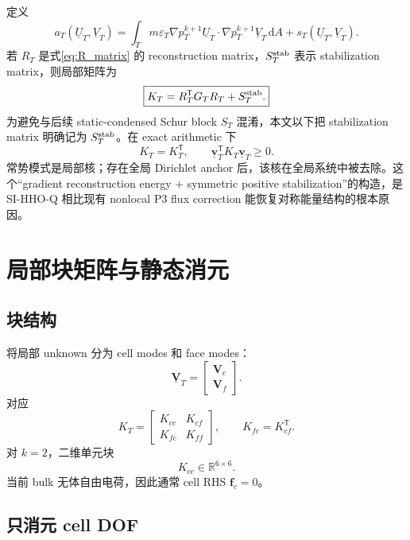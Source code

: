 \documentclass[UTF8,a4paper,11pt]{ctexart}
\newcommand{\R}{\mathbb{R}}
\newcommand{\dd}{\mathrm{d}}
\newcommand{\eps}{\varepsilon}
\newcommand{\vct}[1]{\bm{#1}}
\newcommand{\T}{\mathsf{T}}
\begin{document}
定义
\begin{equation}
\boxed{
 a_T(\underline U_T,\underline V_T)
 =
 \int_Tm\eps_T
 \nabla p_T^{k+1}\underline U_T\cdot
 \nabla p_T^{k+1}\underline V_T\,\dd A
 +s_T(\underline U_T,\underline V_T).
}
\label{eq:local_bilinear}
\end{equation}
若 \(R_T\) 是式\eqref{eq:R_matrix} 的 reconstruction matrix，\(S_T^{\rm stab}\) 表示 stabilization matrix，则局部矩阵为
\begin{equation}
\boxed{
K_T=R_T^{\T}G_TR_T+S_T^{\rm stab}.
}
\label{eq:local_matrix}
\end{equation}
为避免与后续 static-condensed Schur block \(S_T\) 混淆，本文以下把 stabilization matrix 明确记为 \(S_T^{\rm stab}\)。在 exact arithmetic 下
\[
K_T=K_T^{\T},\qquad
\underline{\vct v}_T^{\T}K_T\underline{\vct v}_T\ge0.
\]
常势模式是局部核；存在全局 Dirichlet anchor 后，该核在全局系统中被去除。这个“gradient reconstruction energy + symmetric positive stabilization”的构造，是 SI-HHO-Q 相比现有 nonlocal P3 flux correction 能恢复对称能量结构的根本原因。

\section{局部块矩阵与静态消元}

\subsection{块结构}

将局部 unknown 分为 cell modes 和 face modes：
\[
\underline{\vct V}_T=
\begin{bmatrix}
\vct V_c\\ \vct V_f
\end{bmatrix}.
\]
对应
\begin{equation}
K_T=
\begin{bmatrix}
K_{cc}&K_{cf}\\
K_{fc}&K_{ff}
\end{bmatrix},
\qquad K_{fc}=K_{cf}^{\T}.
\label{eq:block_matrix}
\end{equation}
对 \(k=2\)，二维单元块
\[
K_{cc}\in\R^{6\times6}.
\]
当前 bulk 无体自由电荷，因此通常 cell RHS \(\vct f_c=0\)。

\subsection{只消元 cell DOF}
\end{document}
